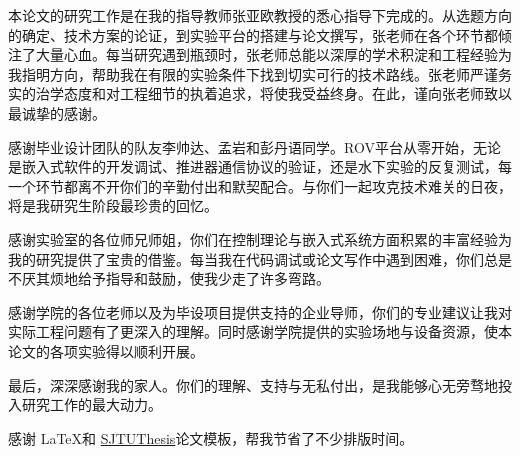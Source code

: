 
\begin{acknowledgements}
  本论文的研究工作是在我的指导教师张亚欧教授的悉心指导下完成的。从选题方向的确定、技术方案的论证，到实验平台的搭建与论文撰写，张老师在各个环节都倾注了大量心血。每当研究遇到瓶颈时，张老师总能以深厚的学术积淀和工程经验为我指明方向，帮助我在有限的实验条件下找到切实可行的技术路线。张老师严谨务实的治学态度和对工程细节的执着追求，将使我受益终身。在此，谨向张老师致以最诚挚的感谢。

  感谢毕业设计团队的队友李帅达、孟岩和彭丹语同学。ROV平台从零开始，无论是嵌入式软件的开发调试、推进器通信协议的验证，还是水下实验的反复测试，每一个环节都离不开你们的辛勤付出和默契配合。与你们一起攻克技术难关的日夜，将是我研究生阶段最珍贵的回忆。

  感谢实验室的各位师兄师姐，你们在控制理论与嵌入式系统方面积累的丰富经验为我的研究提供了宝贵的借鉴。每当我在代码调试或论文写作中遇到困难，你们总是不厌其烦地给予指导和鼓励，使我少走了许多弯路。

  感谢学院的各位老师以及为毕设项目提供支持的企业导师，你们的专业建议让我对实际工程问题有了更深入的理解。同时感谢学院提供的实验场地与设备资源，使本论文的各项实验得以顺利开展。

  最后，深深感谢我的家人。你们的理解、支持与无私付出，是我能够心无旁骛地投入研究工作的最大动力。

  感谢 \LaTeX 和 \href{https://github.com/sjtug/SJTUThesis}{SJTUThesis}论文模板，帮我节省了不少排版时间。
\end{acknowledgements}
